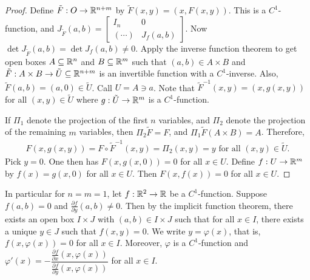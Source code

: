 \begin{proof}
    Define $\tilde{F}:O \to \mathbb{R}^{n+m}$ by $\tilde{F}(x,y) = (x,F(x,y))$. This is a $C^{1}$-function, and $J_{\tilde{F}}(a,b) = \begin{bmatrix}
        I_{n} & 0 \\ (\cdots) & J_{f}(a,b)
    \end{bmatrix}$. Now $\det J_{\tilde{F}}(a,b) = \det J_{f}(a,b) \neq 0$. Apply the inverse function theorem to get open boxes $A \subseteq \mathbb{R}^{n}$ and $B \subseteq \mathbb{R}^{m}$ such that $(a,b) \in A \times B$ and $\tilde{F}:A \times B \to \tilde{U} \subseteq \mathbb{R}^{n+m}$ is an invertible function with a $C^{1}$-inverse. Also, $\tilde{F}(a,b) = (a,0) \in \tilde{U}$. Call $U = A \ni a$. Note that $\tilde{F}^{-1}(x,y) = (x,g(x,y))$ for all $(x,y) \in \tilde{U}$ where $g:\tilde{U} \to \mathbb{R}^{m}$ is a $C^{1}$-function.

    If $\Pi_{1}$ denote the projection of the first $n$ variables, and $\Pi_{2}$ denote the projection of the remaining $m$ variables, then $\Pi_{2}\tilde{F} = F$, and $\Pi_{1}\tilde{F}(A \times B) = A$. Therefore, 
    \begin{align}
        F(x,g(x,y)) = F \circ \tilde{F}^{-1}(x,y) = \Pi_{2}(x,y) = y \text{ for all } (x,y) \in \tilde{U}.
    \end{align}
    Pick $y = 0$. One then has $F(x,g(x,0)) = 0$ for all $x \in U$. Define $f:U \to \mathbb{R}^{m}$ by $f(x) = g(x,0)$ for all $x \in U$. Then $F(x,f(x)) = 0$ for all $x \in U$.
\end{proof}

\begin{remark}
    In particular for $n = m = 1$, let $f:\mathbb{R}^{2} \to \mathbb{R}$ be a $C^{1}$-function. Suppose $f(a,b) = 0$ and $\frac{\partial f}{\partial y}(a,b) \neq 0$. Then by the implicit function theorem, there exists an open box $I \times J$ with $(a,b) \in I \times J$ such that for all $x \in I$, there exists a unique $y \in J$ such that $f(x,y) = 0$. We write $y = \varphi(x)$, that is, $f(x,\varphi(x)) = 0$ for all $x \in I$. Moreover, $\varphi$ is a $C^{1}$-function and $\varphi'(x) = -\dfrac{\frac{\partial f}{\partial x}(x,\varphi(x))}{\frac{\partial f}{\partial y}(x,\varphi(x))}$ for all $x \in I$.
\end{remark}

